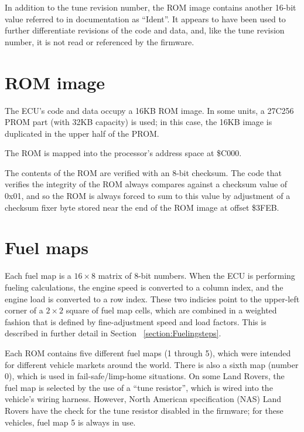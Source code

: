 \documentclass[11pt,twocolumn]{scrartcl}
\begin{document}
In addition to the tune revision number, the ROM image contains another 16-bit value referred to in documentation as ``Ident''. It appears to have been used to further differentiate revisions of the code and data, and, like the tune revision number, it is not read or referenced by the firmware.

\section {ROM image}
The ECU's code and data occupy a 16KB ROM image. In some units, a 27C256 PROM part (with 32KB capacity) is used; in this case, the 16KB image is duplicated in the upper half of the PROM.

The ROM is mapped into the processor's address space at \$C000.

The contents of the ROM are verified with an 8-bit checksum. The code that verifies the integrity of the ROM always compares against a checksum value of 0x01, and so the ROM is always forced to sum to this value by adjustment of a checksum fixer byte stored near the end of the ROM image at offset \$3FEB.

\section {Fuel maps}
Each fuel map is a $16\times8$ matrix of 8-bit numbers. When the ECU is performing fueling calculations, the engine speed is converted to a column index, and the engine load is converted to a row index. These two indicies point to the upper-left corner of a $2\times2$ square of fuel map cells, which are combined in a weighted fashion that is defined by fine-adjustment speed and load factors. This is described in further detail in Section ~\ref{section:Fuelingsteps}.

Each ROM contains five different fuel maps (1 through 5), which were intended for different vehicle markets around the world. There is also a sixth map (number 0), which is used in fail-safe/limp-home situations. On some Land Rovers, the fuel map is selected by the use of a ``tune resistor'', which is wired into the vehicle's wiring harness. However, North American specification (NAS) Land Rovers have the check for the tune resistor disabled in the firmware; for these vehicles, fuel map 5 is always in use.
\end{document}
